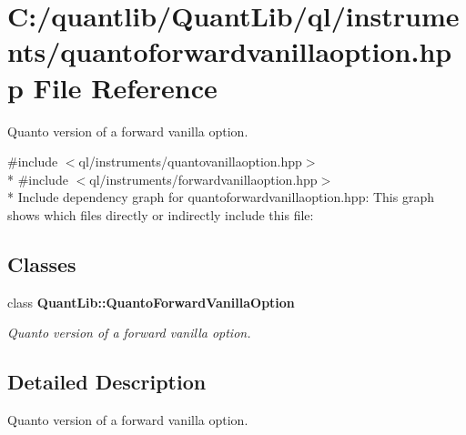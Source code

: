 \section{C\+:/quantlib/\+Quant\+Lib/ql/instruments/quantoforwardvanillaoption.hpp File Reference}
\label{quantoforwardvanillaoption_8hpp}


Quanto version of a forward vanilla option.  


{\ttfamily \#include $<$ql/instruments/quantovanillaoption.\+hpp$>$}\\*
{\ttfamily \#include $<$ql/instruments/forwardvanillaoption.\+hpp$>$}\\*
Include dependency graph for quantoforwardvanillaoption.\+hpp\+:
This graph shows which files directly or indirectly include this file\+:
\subsection*{Classes}
\begin{DoxyCompactItemize}
\item 
class {\bf Quant\+Lib\+::\+Quanto\+Forward\+Vanilla\+Option}
\begin{DoxyCompactList}\small\item\em Quanto version of a forward vanilla option. \end{DoxyCompactList}\end{DoxyCompactItemize}


\subsection{Detailed Description}
Quanto version of a forward vanilla option. 

